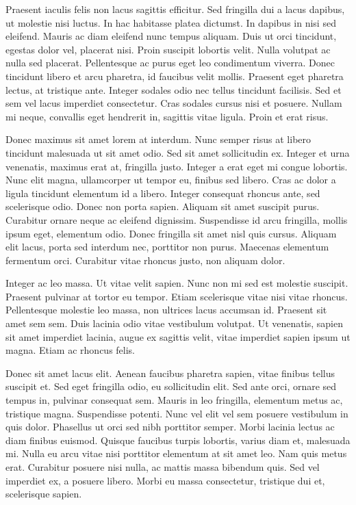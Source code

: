 \documentclass[superscriptaddress,a0]{sciposter}
\begin{document}
\begin{multicols}{3}
Praesent iaculis felis non lacus sagittis efficitur. Sed fringilla dui a lacus dapibus, ut molestie nisi luctus. In hac habitasse platea dictumst. In dapibus in nisi sed eleifend. Mauris ac diam eleifend nunc tempus aliquam. Duis ut orci tincidunt, egestas dolor vel, placerat nisi. Proin suscipit lobortis velit. Nulla volutpat ac nulla sed placerat. Pellentesque ac purus eget leo condimentum viverra. Donec tincidunt libero et arcu pharetra, id faucibus velit mollis. Praesent eget pharetra lectus, at tristique ante. Integer sodales odio nec tellus tincidunt facilisis. Sed et sem vel lacus imperdiet consectetur. Cras sodales cursus nisi et posuere. Nullam mi neque, convallis eget hendrerit in, sagittis vitae ligula. Proin et erat risus.

Donec maximus sit amet lorem at interdum. Nunc semper risus at libero tincidunt malesuada ut sit amet odio. Sed sit amet sollicitudin ex. Integer et urna venenatis, maximus erat at, fringilla justo. Integer a erat eget mi congue lobortis. Nunc elit magna, ullamcorper ut tempor eu, finibus sed libero. Cras ac dolor a ligula tincidunt elementum id a libero. Integer consequat rhoncus ante, sed scelerisque odio. Donec non porta sapien. Aliquam sit amet suscipit purus. Curabitur ornare neque ac eleifend dignissim. Suspendisse id arcu fringilla, mollis ipsum eget, elementum odio. Donec fringilla sit amet nisl quis cursus. Aliquam elit lacus, porta sed interdum nec, porttitor non purus. Maecenas elementum fermentum orci. Curabitur vitae rhoncus justo, non aliquam dolor.

Integer ac leo massa. Ut vitae velit sapien. Nunc non mi sed est molestie suscipit. Praesent pulvinar at tortor eu tempor. Etiam scelerisque vitae nisi vitae rhoncus. Pellentesque molestie leo massa, non ultrices lacus accumsan id. Praesent sit amet sem sem. Duis lacinia odio vitae vestibulum volutpat. Ut venenatis, sapien sit amet imperdiet lacinia, augue ex sagittis velit, vitae imperdiet sapien ipsum ut magna. Etiam ac rhoncus felis.

Donec sit amet lacus elit. Aenean faucibus pharetra sapien, vitae finibus tellus suscipit et. Sed eget fringilla odio, eu sollicitudin elit. Sed ante orci, ornare sed tempus in, pulvinar consequat sem. Mauris in leo fringilla, elementum metus ac, tristique magna. Suspendisse potenti. Nunc vel elit vel sem posuere vestibulum in quis dolor. Phasellus ut orci sed nibh porttitor semper. Morbi lacinia lectus ac diam finibus euismod. Quisque faucibus turpis lobortis, varius diam et, malesuada mi. Nulla eu arcu vitae nisi porttitor elementum at sit amet leo. Nam quis metus erat. Curabitur posuere nisi nulla, ac mattis massa bibendum quis. Sed vel imperdiet ex, a posuere libero. Morbi eu massa consectetur, tristique dui et, scelerisque sapien.


\end{multicols}
\end{document}
